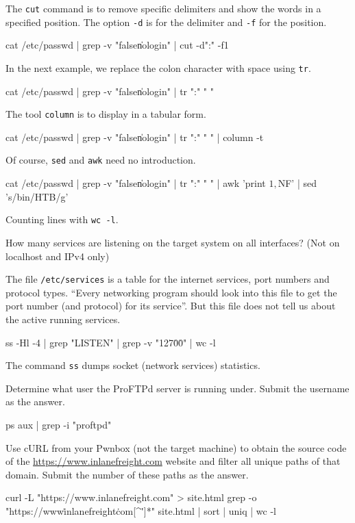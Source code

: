 \documentclass[a4paper,10pt]{article}
\begin{document}
The \texttt{cut} command is to remove specific delimiters and show the words in a specified position. The option \texttt{-d} is for the delimiter and \texttt{-f} for the position.
\begin{bash}
cat /etc/passwd | grep -v "false\|nologin" | cut -d":" -f1
\end{bash}

In the next example, we replace the colon character with space using \texttt{tr}.
\begin{bash}
cat /etc/passwd | grep -v "false\|nologin" | tr ":" " "
\end{bash}

The tool \texttt{column} is to display in a tabular form.
\begin{bash}
cat /etc/passwd | grep -v "false\|nologin" | tr ":" " " | column -t
\end{bash}

Of course, \texttt{sed} and \texttt{awk} need no introduction.
\begin{bash}
cat /etc/passwd | grep -v "false\|nologin" | tr ":" " " |
awk '{print $1, $NF}' | sed 's/bin/HTB/g'
\end{bash}

Counting lines with \texttt{wc -l}.

\n

How many services are listening on the target system on all interfaces? (Not on localhost and IPv4 only)

The file \texttt{/etc/services} is a table for the internet services, port numbers and protocol types. ``Every networking program should look into this file to get the port number (and protocol) for its service''. But this file does not tell us about the active running services.
\begin{bash}
ss -Hl -4 | grep "LISTEN" | grep -v "127\.0\.0" | wc -l
\end{bash}

The command \texttt{ss} dumps socket (network services) statistics.

\n

Determine what user the ProFTPd server is running under. Submit the username as the answer.
\begin{bash}
ps aux | grep -i "proftpd"
\end{bash}

\n

Use cURL from your Pwnbox (not the target machine) to obtain the source code of the \url{https://www.inlanefreight.com} website and filter all unique paths of that domain. Submit the number of these paths as the answer.
\begin{bash}
curl -L "https://www.inlanefreight.com" > site.html
grep -o "https\?://www\.inlanefreight\.com[^\"']*" site.html |
sort | uniq | wc -l
\end{bash}
\end{document}
